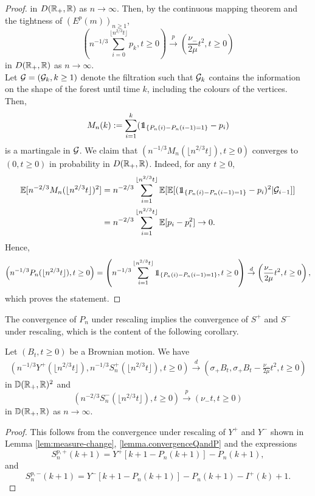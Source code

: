 \begin{proof}
in $D({\mathbb R}_+,{\mathbb R})$ as $n\to \infty$. 
Then, by the continuous mapping theorem and the tightness of $(E^p(m))_{n\geq 1}$,
$$\left(n^{-1/3}\sum_{i=0}^{\lfloor n^{2/3}t \rfloor} p_k , t \geq 0\right)\overset{p}{\to} \left(\frac{\nu_-}{2\mu}t^2,t\geq 0\right)$$
in $D({\mathbb R}_+,{\mathbb R})$ as $n\to \infty$. \\
Let ${\mathcal G}=({\mathcal G}_k,k\geq 1)$ denote the filtration such that ${\mathcal G}_{k}$ contains the information on the shape of the forest until time $k$, including the colours of the vertices. Then, 
$$M_n(k):=\sum_{i=1}^k (\one_{\{P_n(i)-P_n(i-1)=1\}}-p_i)$$ is a martingale in ${\mathcal G}$. We claim that $(n^{-1/3}M_n(\lfloor n^{2/3} t\rfloor ), t\geq 0)$ converges to $(0,t\geq 0)$ in probability in $D({\mathbb R}_+,{\mathbb R})$. Indeed, for any $t\geq 0$,
\begin{align*}\E[n^{-2/3}M_n(\lfloor n^{2/3} t\rfloor )^2]&=n^{-2/3}\sum_{i=1}^{\lfloor n^{2/3} t\rfloor} \E[\E[(\one_{\{P_n(i)-P_n(i-1)=1\}}-p_i)^2|\cG_{i-1}]]\\&=n^{-2/3}\sum_{i=1}^{\lfloor n^{2/3} t\rfloor} \E[p_i-p_i^2]\to 0.\end{align*}
Hence,
$$\left(n^{-1/3}P_n(\lfloor n^{2/3}t\rfloor), t\geq 0\right)=\left(n^{-1/3}\sum_{i=1}^{\lfloor n^{2/3}t\rfloor}  \one_{\{P_n(i)-P_n(i-1)=1\}}  , t\geq 0\right)\overset{d}{\to} \left( \frac{\nu_-}{2\mu}t^2, t\geq 0 \right),$$
 which proves the statement.

\end{proof}

The convergence of $P_n$ under rescaling implies the convergence of $S^{+}$ and $S^{-}$ under rescaling, which is the content of the following corollary. 

\begin{corollary}\label{cor.lukasiewiczpathpurplevertices}
 Let $(B_t,t\geq 0)$ be a Brownian motion. We have 
 \begin{align*}\left(n^{-1/3}Y^{+}\left(\lfloor n^{2/3}t\rfloor\right), n^{-1/3}S^{+}_n\left(\lfloor n^{2/3}t\rfloor\right), t\geq 0\right)\overset{d}{\to}\left(\sigma_+B_t,\sigma_+B_t-\frac{\nu_-}{2\mu}t^2,  t\geq 0\right)\end{align*}
 in ${\mathbb D}({\mathbb R}_+,{\mathbb R})^2$  and 
 $$\left(n^{-2/3}S^{-}_n\left(\lfloor n^{2/3}t\rfloor\right),t\geq 0\right)\overset{p}{\to}\left(\nu_- t,t\geq 0\right)$$
 in ${\mathbb D}({\mathbb R}_+,{\mathbb R})$ as $n\to\infty$.
\end{corollary}
\begin{proof}
 This follows from the convergence under rescaling of $Y^+$ and $Y^-$ shown in Lemma \ref{lem:measure-change}, \ref{lemma.convergenceQandP} and the expressions 
 $$S_n^{p,+}(k+1)=Y^+\left[k+1-P_n(k+1)\right]-P_n(k+1),$$ and $$S_n^{p,-}(k+1)=Y^-\left[k+1-P_n(k+1)\right]-P_n(k+1)-I^{+}(k)+1.$$
\end{proof}

